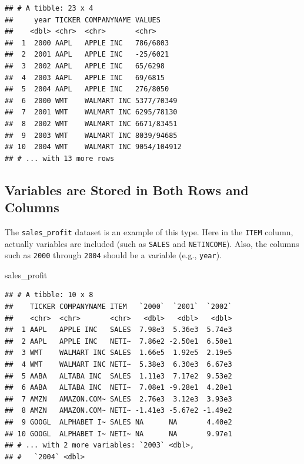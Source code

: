 \documentclass[
]{book}
\newenvironment{Shaded}{\begin{snugshade}}{\end{snugshade}}
\newcommand{\NormalTok}[1]{#1}
\begin{document}
\begin{verbatim}
## # A tibble: 23 x 4
##     year TICKER COMPANYNAME VALUES     
##    <dbl> <chr>  <chr>       <chr>      
##  1  2000 AAPL   APPLE INC   786/6803   
##  2  2001 AAPL   APPLE INC   -25/6021   
##  3  2002 AAPL   APPLE INC   65/6298    
##  4  2003 AAPL   APPLE INC   69/6815    
##  5  2004 AAPL   APPLE INC   276/8050   
##  6  2000 WMT    WALMART INC 5377/70349 
##  7  2001 WMT    WALMART INC 6295/78130 
##  8  2002 WMT    WALMART INC 6671/83451 
##  9  2003 WMT    WALMART INC 8039/94685 
## 10  2004 WMT    WALMART INC 9054/104912
## # ... with 13 more rows
\end{verbatim}

\hypertarget{variables-are-stored-in-both-rows-and-columns}{%
\subsection{Variables are Stored in Both Rows and Columns}\label{variables-are-stored-in-both-rows-and-columns}}

The \texttt{sales\_profit} dataset is an example of this type. Here in the \texttt{ITEM} column, actually variables are included (such as \texttt{SALES} and \texttt{NETINCOME}). Also, the columns such as \texttt{2000} through \texttt{2004} should be a variable (e.g., \texttt{year}).

\begin{Shaded}
\begin{Highlighting}[]
\NormalTok{sales\_profit }
\end{Highlighting}
\end{Shaded}

\begin{verbatim}
## # A tibble: 10 x 8
##    TICKER COMPANYNAME ITEM   `2000`  `2001`  `2002`
##    <chr>  <chr>       <chr>   <dbl>   <dbl>   <dbl>
##  1 AAPL   APPLE INC   SALES  7.98e3  5.36e3  5.74e3
##  2 AAPL   APPLE INC   NETI~  7.86e2 -2.50e1  6.50e1
##  3 WMT    WALMART INC SALES  1.66e5  1.92e5  2.19e5
##  4 WMT    WALMART INC NETI~  5.38e3  6.30e3  6.67e3
##  5 AABA   ALTABA INC  SALES  1.11e3  7.17e2  9.53e2
##  6 AABA   ALTABA INC  NETI~  7.08e1 -9.28e1  4.28e1
##  7 AMZN   AMAZON.COM~ SALES  2.76e3  3.12e3  3.93e3
##  8 AMZN   AMAZON.COM~ NETI~ -1.41e3 -5.67e2 -1.49e2
##  9 GOOGL  ALPHABET I~ SALES NA      NA       4.40e2
## 10 GOOGL  ALPHABET I~ NETI~ NA      NA       9.97e1
## # ... with 2 more variables: `2003` <dbl>,
## #   `2004` <dbl>
\end{verbatim}
\end{document}
